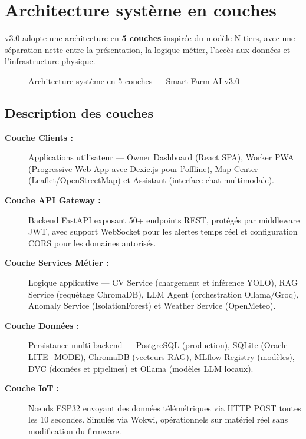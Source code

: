 \section{Architecture système en couches}

\farmAI{} v3.0 adopte une architecture en \textbf{5 couches} inspirée du modèle
N-tiers, avec une séparation nette entre la présentation, la logique métier, l'accès
aux données et l'infrastructure physique.

\begin{figure}[H]
\centering
\resizebox{\textwidth}{!}{%

}
\caption{Architecture système en 5 couches — Smart Farm AI v3.0}
\label{fig:archi_systeme}
\end{figure}

\subsection{Description des couches}

\begin{description}
  \item[\textbf{Couche Clients :}] Applications utilisateur — Owner Dashboard (React SPA),
        Worker PWA (Progressive Web App avec Dexie.js pour l'offline), Map Center
        (Leaflet/OpenStreetMap) et Assistant (interface chat multimodale).

  \item[\textbf{Couche API Gateway :}] Backend FastAPI exposant 50+ endpoints REST,
        protégés par middleware JWT, avec support WebSocket pour les alertes temps réel
        et configuration CORS pour les domaines autorisés.

  \item[\textbf{Couche Services Métier :}] Logique applicative — CV Service (chargement
        et inférence YOLO), RAG Service (requêtage ChromaDB), LLM Agent (orchestration
        Ollama/Groq), Anomaly Service (IsolationForest) et Weather Service (OpenMeteo).

  \item[\textbf{Couche Données :}] Persistance multi-backend — PostgreSQL (production),
        SQLite (Oracle LITE\_MODE), ChromaDB (vecteurs RAG), MLflow Registry (modèles),
        DVC (données et pipelines) et Ollama (modèles LLM locaux).

  \item[\textbf{Couche IoT :}] Nœuds ESP32 envoyant des données télémétriques via
        HTTP POST toutes les 10 secondes. Simulés via Wokwi, opérationnels sur
        matériel réel sans modification du firmware.
\end{description}

